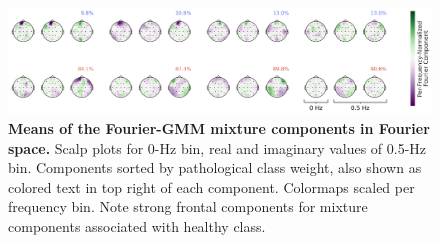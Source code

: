 \begin{figure}[htb]
    \myfloatalign
    \includegraphics[width=1\linewidth]{images/low-freq-gmm-prototypes-scaled-per-freq-with-class-color-and-bar.png}
    \caption[Fourier-GMM means in Fourier space]{
\textbf{Means of the Fourier-GMM mixture components in Fourier space.}
Scalp plots for 0-Hz bin, real and imaginary values of 0.5-Hz bin.
Components sorted by pathological class weight, also shown as colored
text in top right of each component. Colormaps scaled per frequency bin.
Note strong frontal components for mixture components associated with
healthy class.
}
\label{fourier-gmm-low-freq-fig}
\end{figure}


